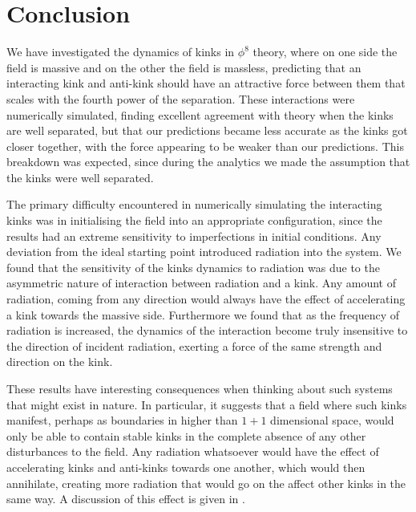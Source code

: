 \documentclass[11pt, oneside]{article}  	%
\numberwithin{equation}{section}
\begin{document}
\section{Conclusion}
We have investigated the dynamics of kinks in $\phi^8$ theory, where on one side the field is massive and on the other the field is massless, predicting that an interacting kink and anti-kink should have an attractive force between them that scales with the fourth power of the separation. These interactions were numerically simulated, finding excellent agreement with theory when the kinks are well separated, but that our predictions became less accurate as the kinks got closer together, with the force appearing to be weaker than our predictions. This breakdown was expected, since during the analytics we made the assumption that the kinks were well separated.\par
The primary difficulty encountered in numerically simulating the interacting kinks was in initialising the field into an appropriate configuration, since the results had an extreme sensitivity to imperfections in initial conditions. Any deviation from the ideal starting point introduced radiation into the system. We found that the sensitivity of the kinks dynamics to radiation was due to the asymmetric nature of interaction between radiation and a kink. Any amount of radiation, coming from any direction would always have the effect of accelerating a kink towards the massive side. Furthermore we found that as the frequency of radiation is increased, the dynamics of the interaction become truly insensitive to the direction of incident radiation, exerting a force of the same strength and direction on the kink.\par
These results have interesting consequences when thinking about such systems that might exist in nature. In particular, it suggests that a field where such kinks manifest, perhaps as boundaries in higher than $1 + 1$ dimensional space, would only be able to contain stable kinks in the complete absence of any other disturbances to the field. Any radiation whatsoever would have the effect of accelerating kinks and anti-kinks towards one another, which would then annihilate, creating more radiation that would go on the affect other kinks in the same way. A discussion of this effect is given in \cite{Roma_czukiewicz_2017}.\par
\end{document}
